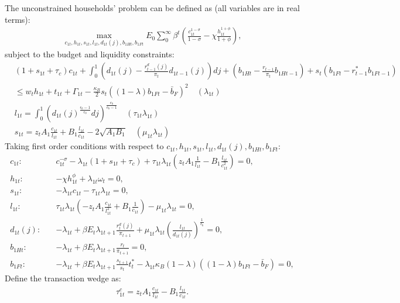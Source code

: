 \documentclass[12pt]{article}
\begin{document}
The unconstrained households' problem can be defined as (all variables are in real terms):
\begin{align*}
\max_{c_{1t}, h_{1t},s_{1t},l_{1t},d_{1t}(j),b_{1Ht},b_{1Ft}} E_0 \sum_0^{\infty}\beta^t (\frac{c_{1t}^{1-\sigma}}{1-\sigma}-\chi\frac{h_{1t}^{1+\phi}}{1+\phi}),
\end{align*}
subject to the budget and liquidity constraints:
\begin{align*} 
&(1+s_{1t}+\tau_c)c_{1t}+\int_0^1(d_{1t}(j)-\frac{r_{t-1}^d(j)}{\pi_t}d_{1t-1}(j))dj +(b_{1Ht}-\frac{r_{t-1}}{\pi_t}b_{1Ht-1})+s_t(b_{1Ft}-r^*_{t-1}b_{1Ft-1}) \\
&\leq w_th_{1t}+t_{1t}+\Gamma_{1t}-\frac{\kappa_B}{2}s_t((1-\lambda)b_{1Ft}-\bar{b}_F)^2 \quad (\lambda_{1t}) \\
&l_{1t} = \int_0^1({d_{1t}(j)}^{\frac{\epsilon_b-1}{\epsilon_b}}dj)^{\frac{\epsilon_b}{\epsilon_b-1}} \quad (\tau_{1t}\lambda_{1t}) \\
&s_{1t} = z_tA_1\frac{c_{1t}}{l_{1t}}+B_1\frac{l_{1t}}{c_{1t}}-2\sqrt{A_1B_1}  \quad (\mu_{1t}\lambda_{1t})
\end{align*}
Taking first order conditions with respect to $c_{1t}, h_{1t}, s_{1t}, l_{1t}, d_{1t}(j), b_{1Ht}, b_{1Ft}$: 
\begin{align}
\label{c1}
c_{1t}: \quad &c_{1t}^{-\sigma}-\lambda_{1t}(1+s_{1t}+\tau_c)+\tau_{1t}\lambda_{1t}(z_tA_1\frac{1}{l_{1t}}-B_1\frac{l_{1t}}{c_{1t}^2}) = 0, \\
\label{h1}
h_{1t}: \quad &-\chi h_{1t}^{\phi}+\lambda_{1t}\omega_t  = 0, \\
\label{s1}
s_{1t}: \quad &-\lambda_{1t}c_{1t}-\tau_{1t}\lambda_{1t} = 0, \\
\label{l1}
l_{1t}: \quad &\tau_{1t}\lambda_{1t}(-z_tA_1\frac{c_{1t}}{l_{1t}^2}+B_1\frac{1}{c_{1t}})-\mu_{1t}\lambda_{1t} = 0, \\
\label{d1j}
d_{1t}(j): \quad &-\lambda_{1t}+\beta E_t\lambda_{1t+1}\frac{r_{t}^d(j)}{\pi_{t+1}}+\mu_{1t}\lambda_{1t}(\frac{l_{1t}}{d_{1t}(j)})^{\frac{1}{\epsilon_b}} = 0, \\
\label{b1H}
b_{1Ht}: \quad &-\lambda_{1t}+\beta E_t\lambda_{1t+1}\frac{r_t}{\pi_{t+1}} = 0, \\
\label{b1F}
b_{1Ft}: \quad &-\lambda_{1t}+\beta E_t\lambda_{1t+1}\frac{s_{t+1}}{s_t}t_t^*-\lambda_{1t}\kappa_B(1-\lambda)((1-\lambda)b_{1Ft}-\bar{b}_F) = 0,
\end{align}
Define the transaction wedge as:
\begin{align}
\label{tau1c}
\tau_{1t}^c = z_tA_1\frac{c_{1t}}{l_{1t}}-B_1\frac{l_{1t}}{c_{1t}}.
\end{align}
\end{document}
